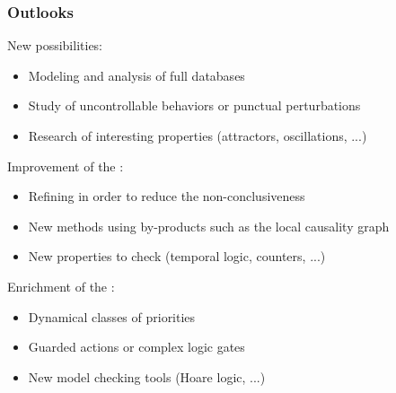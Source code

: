 \begin{frame}[c]
  \frametitle{Outlooks}

New  possibilities:
\begin{itemize}
  \item Modeling and analysis of full databases
  \item Study of uncontrollable behaviors or punctual perturbations
  \item Research of interesting properties (attractors, oscillations, ...)
\end{itemize}

\medskip
Improvement of the :
\begin{itemize}
  \item Refining in order to reduce the non-conclusiveness
  \item New methods using by-products such as the local causality graph
  \item New properties to check (temporal logic, counters, ...)
\end{itemize}

\medskip
Enrichment of the :
\begin{itemize}
  \item Dynamical classes of priorities
  \item Guarded actions or complex logic gates
  \item New model checking tools (Hoare logic, ...)
\end{itemize}

\end{frame}




